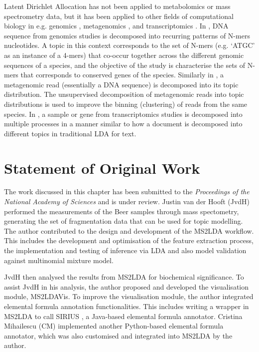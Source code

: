 Latent Dirichlet Allocation has not been applied to metabolomics or mass spectrometry data, but it has been applied to other fields of computational biology in e.g. genomics \cite{chen2010probabilistic}, metagenomics \cite{zhang2015exploiting}, and transcriptomics \cite{rogers2005latent}. In \cite{chen2010probabilistic}, DNA sequence from genomics studies is decomposed into recurring patterns of N-mers nucleotides. A topic in this context corresponds to the set of N-mers (e.g. `ATGC' as an instance of a 4-mers) that co-occur together across the different genomic sequences of a species, and the objective of the study is characterise the sets of N-mers that corresponds to conserved genes of the species. Similarly in \cite{zhang2015exploiting}, a metagenomic read (essentially a DNA sequence) is decomposed into its topic distribution. The unsupervised decomposition of metagenomic reads into topic distributions is used to improve the binning (clustering) of reads from the same species. In \cite{rogers2005latent}, a sample or gene from transcriptomics studies is decomposed into multiple processes in a manner similar to how a document is decomposed into different topics in traditional LDA for text.

\section{Statement of Original Work}

The work discussed in this chapter has been submitted to the \textit{Proceedings of the National Academy of Sciences} and is under review. Justin van der Hooft (JvdH) performed the measurements of the Beer samples through mass spectometry, generating the set of fragmentation data that can be used for topic modelling. The author contributed to the design and development of the MS2LDA workflow. This includes the development and optimisation of the feature extraction process, the implementation and testing of inference via LDA and also model validation against multinomial mixture model. 

JvdH then analysed the results from MS2LDA for biochemical significance. To assist JvdH in his analysis, the author proposed and developed the visualisation module, MS2LDAVis. To improve the visualisation module, the author integrated elemental formula annotation functionalities. This includes writing a wrapper in MS2LDA to call SIRIUS \cite{Bocker2009}, a Java-based elemental formula annotator. Cristina Mihailescu (CM) implemented another Python-based elemental formula annotator, which was also customised and integrated into MS2LDA by the author. 

